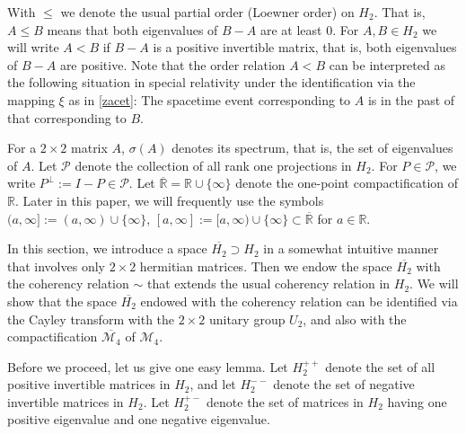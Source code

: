 \documentclass[10pt,a4paper]{amsart}
\providecommand{\index}[1]{}
\newcommand\cP{{\mathcal{P}}}
\newcommand\oH{{\overline{H_2}}}
\newcommand\oR{{\overline{\mathbb{R}}}}
\theoremstyle{definition}
\theoremstyle{remark}
\numberwithin{subsection}{section}
\numberwithin{equation}{section}
\begin{document}
With $\le$ \index{$\le$} we denote the usual partial order (Loewner order\index{Loewner order}) on $H_2$. That is, $A\leq B$ means that both eigenvalues of $B-A$ are at least $0$.
For $A,B \in H_2$ we will write $A < B$ \index{$<$} if $B-A$ is a positive invertible matrix, that is, both eigenvalues of $B-A$ are positive.
Note that the order relation $A<B$ can be interpreted as the following situation in special relativity under the identification via the mapping $\xi$ as in \eqref{zacet}: 
The spacetime event corresponding to $A$ is in the past of that corresponding to $B$.

For a $2 \times 2$ matrix $A$,  $\sigma(A)$ \index{$sigmaA$@$\sigma(A)$} denotes its spectrum, that is, the set of eigenvalues of $A$.
Let $\cP$ \index{$P$@$\mathcal{P}$} denote the collection of all rank one projections in $H_2$.
For $P\in \mathcal{P}$, we write $P^\perp:= I-P\in \mathcal{P}$\index{$P^\perp$}. 
Let $\oR=\mathbb{R}\cup\{\infty\}$\index{$\infty$}\index{$R$@$\oR$} denote the one-point compactification of $\mathbb{R}$. Later in this paper, we will frequently use the symbols $(a,\infty] :=(a, \infty)\cup \{\infty\}$\index{$a$1@$(a,\infty]$}, $[a,\infty] :=[a, \infty)\cup \{\infty\}\subset \oR$ \index{$a$2@$[a,\infty]$} for $a\in \mathbb{R}$.

In this section, we introduce a space $\oH\supset H_2$ in a somewhat intuitive manner that involves only $2\times 2$ hermitian matrices. 
Then we endow the space $\oH$ with the coherency relation $\sim$ that extends the usual coherency relation in $H_2$.
We will show that the space $\oH$ endowed with the coherency relation can be identified via the Cayley transform with the $2\times 2$ unitary group $U_2$, and also with the compactification $\overline{\mathcal{M}_4}$ of $\mathcal{M}_4$.

Before we proceed, let us give one easy lemma. 
Let $H_{2}^{++}$\index{$H_2^{++}$} denote the set of all positive invertible matrices in $H_2$, and let $H_{2}^{--}$\index{$H_2^{--}$} denote the set of negative invertible matrices in $H_2$.
Let $H_{2}^{+-}$ \index{$H_2^{+-}$} denote the set of matrices in $H_2$ having one positive eigenvalue and one negative eigenvalue. 
\end{document}

